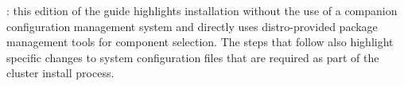 
\vspace{\baselineskip} %
: this edition of the guide highlights
installation without the use of a companion configuration management system and
directly uses distro-provided package management tools for component
selection. The steps that follow also highlight specific changes to system
configuration files that are required as part of the cluster install
process.
